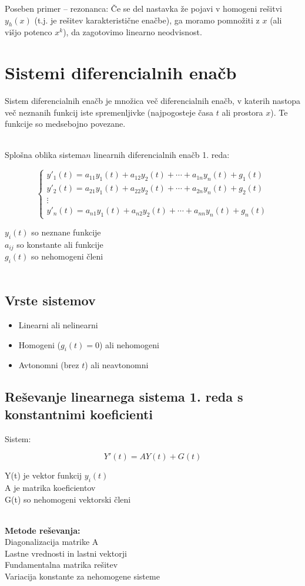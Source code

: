 \documentclass[12pt]{report}
\begin{document}
Poseben primer – rezonanca: Če se del nastavka že pojavi v homogeni rešitvi $y_h(x)$ (t.j. je
rešitev karakteristične enačbe), ga moramo pomnožiti z $x$ (ali višjo potenco $x^k$), da zagotovimo linearno neodvisnost.


\section*{Sistemi diferencialnih enačb}

Sistem diferencialnih enačb je množica več diferencialnih enačb, v katerih nastopa več neznanih funkcij iste spremenljivke (najpogosteje časa $t$ ali prostora $x$). Te funkcije so medsebojno povezane.\\\

Splošna oblika sistema$n$ linearnih diferencialnih enačb 1. reda:

\[\begin{cases}
y'_1(t) = a_{11}y_1(t) + a_{12}y_2(t) + \cdots + a_{1n}y_n(t) + g_1(t) \\
y'_2(t) = a_{21}y_1(t) + a_{22}y_2(t) + \cdots + a_{2n}y_n(t) + g_2(t) \\
\vdots \\
y'_n(t) = a_{n1}y_1(t) + a_{n2}y_2(t) + \cdots + a_{nn}y_n(t) + g_n(t)
\end{cases}
\]

$y_i(t)$ so neznane funkcije\\
$a_{ij}$ so konstante ali funkcije\\
$g_i(t)$ so nehomogeni členi\\\


\subsection*{Vrste sistemov}
\begin{itemize}
\item Linearni ali nelinearni
\item Homogeni ($g_i(t) = 0$) ali nehomogeni
\item Avtonomni (brez $t$) ali neavtonomni
\end{itemize}

\subsection*{Reševanje linearnega sistema 1. reda s konstantnimi koeficienti}

Sistem:  

\[Y'(t) = AY(t) + G(t)\]

Y(t) je vektor funkcij $y_i(t)$\\
A je matrika koeficientov\\
G(t) so nehomogeni vektorski členi\\\

\textbf{Metode reševanja:}\\
Diagonalizacija matrike A\\
Lastne vrednosti in lastni vektorji\\
Fundamentalna matrika rešitev\\
Variacija konstante za nehomogene sisteme
\end{document}
